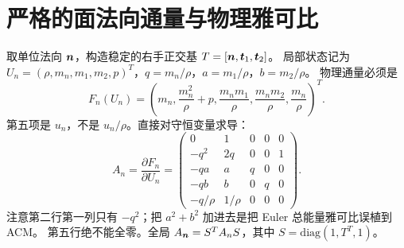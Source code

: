 \documentclass[UTF8,11pt,a4paper]{ctexart}
\begin{document}
\section{严格的面法向通量与物理雅可比}
取单位法向 $\bm{n}$，构造稳定的右手正交基 $T=[\bm{n},\bm{t}_1,\bm{t}_2]$。
局部状态记为 $U_n=(\rho,m_n,m_1,m_2,p)^T$，$q=m_n/\rho$，$a=m_1/\rho$，$b=m_2/\rho$。
物理通量必须是
\begin{equation}
 F_n(U_n)=\left(m_n,\frac{m_n^2}{\rho}+p,
 \frac{m_nm_1}{\rho},\frac{m_nm_2}{\rho},\frac{m_n}{\rho}\right)^T.\label{eq:F}
\end{equation}
第五项是 $u_n$，不是 $u_n/\rho$。直接对守恒变量求导：
\begin{equation}
A_n=\frac{\partial F_n}{\partial U_n}=
\begin{pmatrix}
0&1&0&0&0\\
-q^2&2q&0&0&1\\
-qa&a&q&0&0\\
-qb&b&0&q&0\\
-q/\rho&1/\rho&0&0&0
\end{pmatrix}.\label{eq:A}
\end{equation}
注意第二行第一列只有 $-q^2$；把 $a^2+b^2$ 加进去是把 Euler 总能量雅可比误植到 ACM。
第五行绝不能全零。全局 $A_{\bm{n}}=S^TA_nS$，其中 $S=\mathrm{diag}(1,T^T,1)$。
\end{document}
